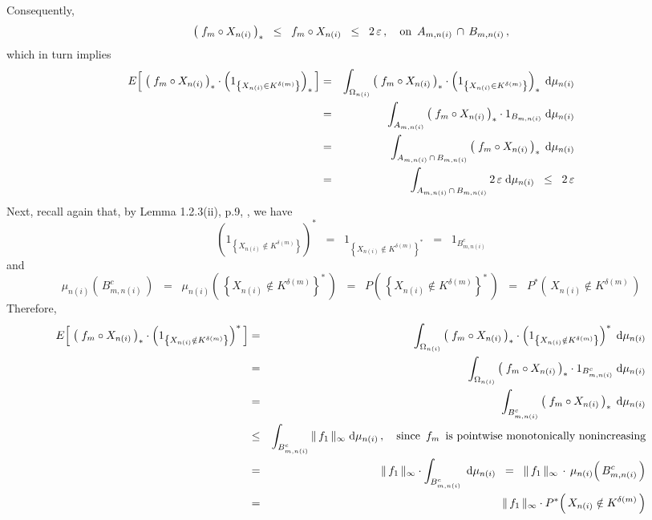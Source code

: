 Consequently,
\begin{equation*}
\left(\;f_{m} \circ X_{n(i)}\,\right)_{*}
\;\; \leq \;\;
	f_{m} \circ X_{n(i)}
\;\; \leq \;\;
	2\,\varepsilon\,,
\quad
\textnormal{on \,$A_{m,n(i)} \,\cap\, B_{m,n(i)}$}\,,
\end{equation*}
which in turn implies
\begin{eqnarray*}
E\!\left[\;
	\left(\;f_{m} \circ X_{n(i)}\,\right)_{*}
	\cdot
	\left(1_{\left\{X_{n(i)} \in K^{\delta(m)}\right\}}\right)_{*}
\,\right]
&=&
	\int_{\Omega_{n(i)}}
		\left(\;f_{m} \circ X_{n(i)}\,\right)_{*}
		\cdot
		\left(1_{\left\{X_{n(i)} \in K^{\delta(m)}\right\}}\right)_{*}
	\;\textnormal{d}\mu_{n(i)}
\\
&=&
	\int_{A_{m,n(i)}}
		\left(\;f_{m} \circ X_{n(i)}\,\right)_{*}
		\cdot
		1_{B_{m,n(i)}}
	\;\textnormal{d}\mu_{n(i)}
\\
&=&
	\int_{A_{m,n(i)} \,\cap\, B_{m,n(i)}}
		\left(\;f_{m} \circ X_{n(i)}\,\right)_{*}
	\;\textnormal{d}\mu_{n(i)}
\\
&=&
	\int_{A_{m,n(i)} \,\cap\, B_{m,n(i)}} 2\,\varepsilon \;\textnormal{d}\mu_{n(i)}
\;\; \leq \;\;
	2\,\varepsilon
\end{eqnarray*}
Next, recall again that, by Lemma 1.2.3(ii), p.9, \cite{vanDerVaart1996}, we have
\begin{equation*}
\left(1_{\left\{X_{n(i)} \notin K^{\delta(m)}\right\}}\right)^{*}
\;\; = \;\;
	1_{\left\{X_{n(i)} \notin K^{\delta(m)}\right\}^{*}}
\;\; = \;\;
	1_{B_{m,n(i)}^{c}}
\end{equation*}
and
\begin{equation*}
\mu_{n(i)}\!\left(\,B_{m,n(i)}^{c}\,\right)
\;\; = \;\;
	\mu_{n(i)}\!\left(\,\left\{X_{n(i)} \notin K^{\delta(m)}\right\}^{*}\,\right)
\;\; = \;\;
	P\!\left(\,\left\{X_{n(i)} \notin K^{\delta(m)}\right\}^{*}\,\right)
\;\; = \;\;
	P^{*}\!\left(\,X_{n(i)} \notin K^{\delta(m)}\,\right)
\end{equation*}
Therefore,
\begin{eqnarray*}
E\!\left[\;
	\left(\;f_{m} \circ X_{n(i)}\,\right)_{*}
	\cdot
	\left(1_{\left\{X_{n(i)} \notin K^{\delta(m)}\right\}}\right)^{*}
\,\right]
&=&
	\int_{\Omega_{n(i)}}
		\left(\;f_{m} \circ X_{n(i)}\,\right)_{*}
		\cdot
		\left(1_{\left\{X_{n(i)} \notin K^{\delta(m)}\right\}}\right)^{*}
	\;\textnormal{d}\mu_{n(i)}
\\
&=&
	\int_{\Omega_{n(i)}}
		\left(\;f_{m} \circ X_{n(i)}\,\right)_{*}
		\cdot
		1_{B_{m,n(i)}^{c}}
	\;\textnormal{d}\mu_{n(i)}
\\
&=&
	\int_{B_{m,n(i)}^{c}}
		\left(\;f_{m} \circ X_{n(i)}\,\right)_{*}
	\;\textnormal{d}\mu_{n(i)}
\\
&\leq&
	\int_{B_{m,n(i)}^{c}} \Vert\,f_{1}\,\Vert_{\infty} \;\textnormal{d}\mu_{n(i)}\,,
	\quad
	\textnormal{since \,$f_{m}$\, is pointwise monotonically nonincreasing}
\\
&=&
	\Vert\,f_{1}\,\Vert_{\infty} \cdot \int_{B_{m,n(i)}^{c}} \;\textnormal{d}\mu_{n(i)}
\;\; = \;\;
	\Vert\,f_{1}\,\Vert_{\infty} \,\cdot\, \mu_{n(i)}\!\left(\,B_{m,n(i)}^{c}\,\right)
\\
&=&
	\Vert\,f_{1}\,\Vert_{\infty} \cdot P^{*}\!\left(\,X_{n(i)} \notin K^{\delta(m)}\,\right)
\end{eqnarray*}
